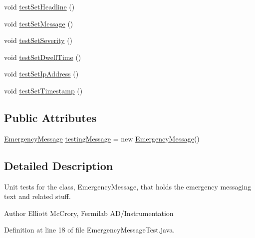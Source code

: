 \begin{DoxyCompactItemize}
\item 
void \hyperlink{classtest_1_1gov_1_1fnal_1_1ppd_1_1dd_1_1emergency_1_1EmergencyMessageTest_aa05281c0f55305cb48851513254064ef}{test\-Set\-Headline} ()
\item 
void \hyperlink{classtest_1_1gov_1_1fnal_1_1ppd_1_1dd_1_1emergency_1_1EmergencyMessageTest_a6aa6f89e59963c6946d0b9f10d79ede2}{test\-Set\-Message} ()
\item 
void \hyperlink{classtest_1_1gov_1_1fnal_1_1ppd_1_1dd_1_1emergency_1_1EmergencyMessageTest_af1c9d16ae89b9ac67e112551b6129197}{test\-Set\-Severity} ()
\item 
void \hyperlink{classtest_1_1gov_1_1fnal_1_1ppd_1_1dd_1_1emergency_1_1EmergencyMessageTest_af0752853a36c3478cde4bcaa857a5fb6}{test\-Set\-Dwell\-Time} ()
\item 
void \hyperlink{classtest_1_1gov_1_1fnal_1_1ppd_1_1dd_1_1emergency_1_1EmergencyMessageTest_abee94a197ef6ecb09d86529bb0440156}{test\-Set\-Ip\-Address} ()
\item 
void \hyperlink{classtest_1_1gov_1_1fnal_1_1ppd_1_1dd_1_1emergency_1_1EmergencyMessageTest_a7f26a35e24c1bdc3a678eab64526833e}{test\-Set\-Timestamp} ()
\end{DoxyCompactItemize}
\subsection*{Public Attributes}
\begin{DoxyCompactItemize}
\item 
\hyperlink{classgov_1_1fnal_1_1ppd_1_1dd_1_1emergency_1_1EmergencyMessage}{Emergency\-Message} \hyperlink{classtest_1_1gov_1_1fnal_1_1ppd_1_1dd_1_1emergency_1_1EmergencyMessageTest_ac50866e8af838c909afcc4e19d058274}{testing\-Message} = new \hyperlink{classgov_1_1fnal_1_1ppd_1_1dd_1_1emergency_1_1EmergencyMessage}{Emergency\-Message}()
\end{DoxyCompactItemize}


\subsection{Detailed Description}
Unit tests for the class, Emergency\-Message, that holds the emergency messaging text and related stuff.

\begin{DoxyAuthor}{Author}
Elliott Mc\-Crory, Fermilab A\-D/\-Instrumentation 
\end{DoxyAuthor}


Definition at line 18 of file Emergency\-Message\-Test.\-java.



